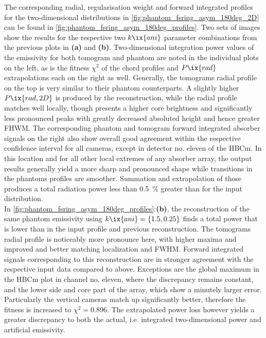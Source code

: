                 The corresponding radial, regularisation weight and forward integrated profiles for the two-dimensional distributions in \cref{fig:phantom_fsring_asym_180deg_2D} can be found in \cref{fig:phantom_fsring_asym_180deg_profiles}. Two sets of images show the results for the respective two $k\ix{ani}$ parameter combinations from the previous plots in \textbf{(a)} and \textbf{(b)}. Two-dimensional integration power values of the emissivity for both tomogram and phantom are noted in the individual plots on the left, as is the fitness $\chi^{2}$ of the chord profiles and $P\ix{rad}$ extrapolations each on the right as well. Generally, the tomograms radial profile on the top is very similar to their phantom counterparts. A slightly higher $P\ix{rad,2D}$ is produced by the reconstruction, while the radial profile matches well locally, though presents a higher core brightness and significantly less pronounced peaks with greatly decreased absoluted height and hence greater FHWM. The corresponding phantom and tomogram forward integrated absorber signals on the right also show overall good agreement within the respective confidence interval for all cameras, except in detector no. eleven of the HBCm. In this location and for all other local extremes of any absorber array, the output results generally yield a more sharp and pronounced shape while transitions in the phantoms profiles are smoother. Summation and extrapolation of those produces a total radiation power less than \SI{0.5}{\percent} greater than for the input distribution.\\%
                In \cref{fig:phantom_fsring_asym_180deg_profiles}:\textbf{(b)}, the reconstruction of the same phantom emissivity using $k\ix{ani}=\left\{1.5, 0.25\right\}$ finds a total power that is lower than in the input profile and previous reconstruction. The tomograms radial profile is noticeably more pronounce here, with higher maxima and improved and better matching localization and FWHM. Forward integrated signals corresponding to this reconstruction are in stronger agreement with the respective input data compared to above. Exceptions are the global maximum in the HBCm plot in channel no. eleven, where the discrepancy remains constant, and the lower side and core part of the array, which show a minutely larger error. Particularly the vertical cameras match up significantly better, therefore the fitness is increased to $\chi^{2}=$\SI{0.896}{\arbitraryunit}. The extrapolated power loss however yields a greater discrepancy to both the actual, i.e. integrated two-dimensional power and artificial emissivity.\\%
